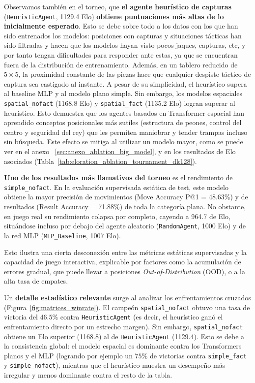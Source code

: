 \documentclass[12pt, a4paper]{article}
\begin{document}
Observamos también en el torneo, que \textbf{el agente heurístico de capturas} (\texttt{HeuristicAgent}, 1129.4 Elo) \textbf{obtiene puntuaciones más altas de lo inicialmente esperado}. Esto se debe sobre todo a los datos con los que han sido entrenados los modelos: posiciones con capturas y situaciones tácticas han sido filtradas y hacen que los modelos hayan visto pocos jaques, capturas, etc, y por tanto tengan dificultades para responder ante estas, ya que se encuentran fuera de la distribución de entrenamiento. Además, en un tablero reducido de $5\times5$, la proximidad constante de las piezas hace que cualquier despiste táctico de captura sea castigado al instante. 
A pesar de su simplicidad, el heurístico supera al baseline MLP y al modelo plano simple. Sin embargo, los modelos espaciales \texttt{spatial\_nofact} (1168.8 Elo) y \texttt{spatial\_fact} (1135.2 Elo) logran superar al heurístico. Esto demuestra que los agentes basados en Transformer espacial han aprendido conceptos posicionales más sutiles (estructura de peones, control del centro y seguridad del rey) que les permiten maniobrar y tender trampas incluso sin búsqueda.
Este efecto se mitiga al utilizar un modelo mayor, como se puede ver en el anexo ~\ref{sec:anexo_ablation_big_model}, y en los resultados de Elo asociados (Tabla~\ref{tab:eloration_ablation_tournament_dk128}).

\textbf{Uno de los resultados más llamativos del torneo} es el rendimiento de \texttt{simple\_nofact}. En la evaluación supervisada estática de test, este modelo obtiene la mayor precisión de movimientos (Move Accuracy P@1 = 48.63\%) y de resultados (Result Accuracy = 71.88\%) de toda la categoría plana. No obstante, en juego real su rendimiento colapsa por completo, cayendo a 964.7 de Elo, situándose incluso por debajo del agente aleatorio (\texttt{RandomAgent}, 1000 Elo) y de la red MLP (\texttt{MLP\_Baseline}, 1007 Elo).

Esto ilustra una cierta desconexión entre las métricas estáticas supervisadas y la capacidad de juego interactiva, explicable por factores como la acumulación de errores gradual, que puede llevar a posiciones \textit{Out-of-Distribution} (OOD), o a la alta tasa de empates.

Un \textbf{detalle estadístico relevante} surge al analizar los enfrentamientos cruzados (Figura~\ref{fig:matrices_winrate}). El campeón \texttt{spatial\_nofact} obtuvo una tasa de victoria del $46.5\%$ contra \texttt{HeuristicAgent} (es decir, el heurístico ganó el enfrentamiento directo por un estrecho margen). Sin embargo, \texttt{spatial\_nofact} obtiene un Elo superior (1168.8) al de \texttt{HeuristicAgent} (1129.4). Esto se debe a la consistencia global: el modelo espacial es dominante contra los Transformers planos y el MLP (logrando por ejemplo un $75\%$ de victorias contra \texttt{simple\_fact} y \texttt{simple\_nofact}), mientras que el heurístico muestra un desempeño más irregular y menos dominante contra el resto de la tabla. 
\end{document}
